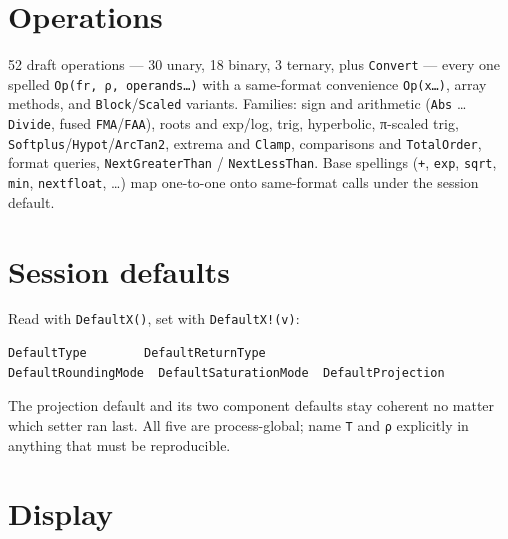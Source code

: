 \section{Operations}



\label{4250268531802119509}{}


52 draft operations — 30 unary, 18 binary, 3 ternary, plus \texttt{Convert} — every one spelled \texttt{Op(fr, ρ, operands…)} with a same-format convenience \texttt{Op(x…)}, array methods, and \texttt{Block}/\allowbreak\texttt{Scaled} variants. Families: sign and arithmetic (\texttt{Abs} … \texttt{Divide}, fused \texttt{FMA}/\allowbreak\texttt{FAA}), roots and exp/log, trig, hyperbolic, π-scaled trig, \texttt{Softplus}/\allowbreak\texttt{Hypot}/\texttt{ArcTan2}, extrema and \texttt{Clamp}, comparisons and \texttt{TotalOrder}, format queries, \texttt{NextGreaterThan} / \texttt{NextLessThan}. Base spellings (\texttt{+}, \texttt{exp}, \texttt{sqrt}, \texttt{min}, \texttt{nextfloat}, …) map one-to-one onto same-format calls under the session default.



\section{Session defaults}



\label{3970345369238056532-dup1}{}


Read with \texttt{DefaultX()}, set with \texttt{DefaultX!(v)}:




\nopagebreak[4]
\begin{verbatim}
DefaultType        DefaultReturnType
DefaultRoundingMode  DefaultSaturationMode  DefaultProjection
\end{verbatim}



The projection default and its two component defaults stay coherent no matter which setter ran last. All five are process-global; name \texttt{T} and \texttt{ρ} explicitly in anything that must be reproducible.



\section{Display}



\label{12429740135947470305-dup1}{}


